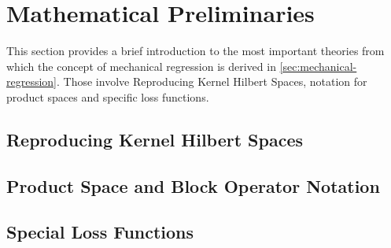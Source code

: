 \section{Mathematical Preliminaries}
\label{sec:preliminaries}

This section provides a brief introduction to the most important theories from which the concept of mechanical regression is derived in \cref{sec:mechanical-regression}.
Those involve Reproducing Kernel Hilbert Spaces, notation for product spaces and specific loss functions.

\subsection{Reproducing Kernel Hilbert Spaces}



%
%

\subsection{Product Space and Block Operator Notation}
\label{sec:block-operator-notation}



\subsection{Special Loss Functions}


%
\pagebreak